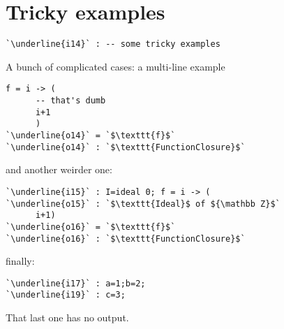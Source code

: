 \documentclass[12pt,a4paper]{amsart}
\begin{document}
\section{Tricky examples}
\begin{lstlisting}[language=Macaulay2]
`\underline{i14}` : -- some tricky examples\end{lstlisting}
A bunch of complicated cases: a multi-line example
\begin{lstlisting}[language=Macaulay2]
      f = i -> (
      -- that's dumb
      i+1
      )
`\underline{o14}` = `$\texttt{f}$`
`\underline{o14}` : `$\texttt{FunctionClosure}$`\end{lstlisting}
and another weirder one:
\begin{lstlisting}[language=Macaulay2]
`\underline{i15}` : I=ideal 0; f = i -> (
`\underline{o15}` : `$\texttt{Ideal}$ of ${\mathbb Z}$`
      i+1)
`\underline{o16}` = `$\texttt{f}$`
`\underline{o16}` : `$\texttt{FunctionClosure}$`\end{lstlisting}
finally:
\begin{lstlisting}[language=Macaulay2]
`\underline{i17}` : a=1;b=2;
`\underline{i19}` : c=3;\end{lstlisting}
That last one has no output.
\end{document}
